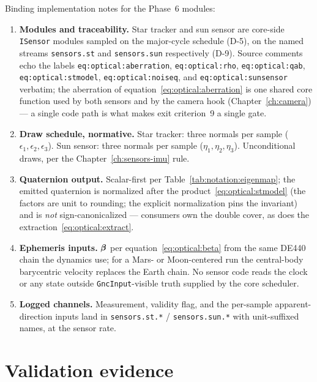 Binding implementation notes for the Phase~6 modules:
\begin{enumerate}
  \item \textbf{Modules and traceability.} Star tracker and sun sensor
    are core-side \texttt{ISensor} modules sampled on the major-cycle
    schedule (D-5), on the named streams \texttt{sensors.st} and
    \texttt{sensors.sun} respectively (D-9). Source comments echo the
    labels \texttt{eq:optical:aberration}, \texttt{eq:optical:rho},
    \texttt{eq:optical:qab}, \texttt{eq:optical:stmodel},
    \texttt{eq:optical:noiseq}, and \texttt{eq:optical:sunsensor}
    verbatim; the aberration of
    equation~\eqref{eq:optical:aberration} is one shared core function
    used by both sensors and by the camera hook
    (Chapter~\ref{ch:camera}) --- a single code path is what makes exit
    criterion~9 a single gate.
  \item \textbf{Draw schedule, normative.} Star tracker: three normals
    per sample ($\epsilon_1, \epsilon_2, \epsilon_3$). Sun sensor: three
    normals per sample ($\eta_1, \eta_2, \eta_3$). Unconditional draws,
    per the Chapter~\ref{ch:sensors-imu} rule.
  \item \textbf{Quaternion output.} Scalar-first per
    Table~\ref{tab:notation:eigenmap}; the emitted quaternion is
    normalized after the product~\eqref{eq:optical:stmodel} (the factors
    are unit to rounding; the explicit normalization pins the invariant)
    and is \emph{not} sign-canonicalized --- consumers own the double
    cover, as does the extraction~\eqref{eq:optical:extract}.
  \item \textbf{Ephemeris inputs.} $\bm{\beta}$ per
    equation~\eqref{eq:optical:beta} from the same DE440 chain the
    dynamics use; for a Mars- or Moon-centered run the central-body
    barycentric velocity replaces the Earth chain. No sensor code reads
    the clock or any state outside \texttt{GncInput}-visible truth
    supplied by the core scheduler.
  \item \textbf{Logged channels.} Measurement, validity flag, and the
    per-sample apparent-direction inputs land in
    \texttt{sensors.st.*} / \texttt{sensors.sun.*} with unit-suffixed
    names, at the sensor rate.
\end{enumerate}

\section{Validation evidence}
\label{sec:optical:validation}

